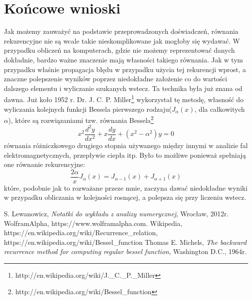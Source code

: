 \documentclass[11pt,leqno]{article}
\begin{document}
\section{Końcowe wnioski}\label{S:Wnioski}
Jak możemy zauważyć na podstawie przeprowadzonych doświadczeń, równania rekurencyjne nie są wcale takie nieskomplikowane jak mogłoby się wydawać.
W przypadku obliczeń na komputerach, gdzie nie możemy reprezentować danych dokładnie, bardzo ważne znaczenie mają własności takiego równania.
Jak w tym przypadku właśnie propagacja błędu w przypadku użycia tej rekurencji wprost, a znaczne polepszenie wyników poprzez niedokładne założenie co do
wartości dalszego elementu i wyliczanie szukanych wstecz. Ta technika była już znana od dawna.
Już koło 1952 r. Dr. J. C. P. Miller\footnote{http://en.wikipedia.org/wiki/J.\_C.\_P.\_Miller} wykorzystał tę metodę, własność do wyliczania kolejnych funkcji Bessela pierwszego rodzaju($J_\alpha(x)$, dla całkowitych $\alpha$), które są rozwiązaniami tzw.
równania Bessela\footnote{http://en.wikipedia.org/wiki/Bessel\_function}
$$
    x^{2} \frac{d^{2} y}{dx^{2}} + x \frac{dy}{dx} + (x^{2} - \alpha^{2})y = 0
$$
równania różniczkowego drugiego stopnia używanego między innymi w analizie fal elektromagnetycznych, przepływie ciepła itp. Było to możliwe ponieważ spełniają one równanie rekurencyjne:
$$
    \frac{2\alpha}{x} J_\alpha(x) = J_{\alpha-1}(x) + J_{\alpha+1}(x)
$$
które, podobnie jak to rozważane przeze mnie, zaczyna dawać niedokładne wyniki w przypadku obliczania w kolejności rosnącej, a polepsza się przy liczeniu wstecz.
\thispagestyle{empty}
\begin{thebibliography}{99}
     S. Lewanowicz, \textit{Notatki do wykładu z analizy numerycznej}, Wrocław, 2012r.
     WolframAlpha, https://www.wolframalpha.com.
     Wikipedia, https://en.wikipedia.org/wiki/Recurrence\_relation, https://en.wikipedia.org/wiki/Bessel\_function
     Thomas E. Michels, \textit{The backward recurrence method for computing regular bessel function}, Washington D.C., 1964r.
\end{thebibliography}
\end{document}
